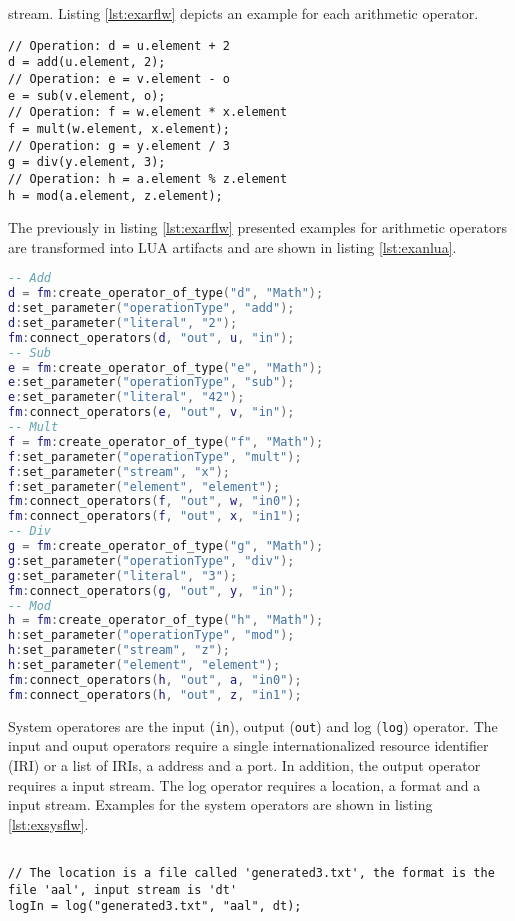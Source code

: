 stream. Listing \ref{lst:exarflw} depicts an example for each arithmetic 
operator.
\begin{lstlisting}[language=Flow, caption={\emph{Examples of Arithmetic Operators in Flow}},label={lst:exarflw}]
// Operation: d = u.element + 2
d = add(u.element, 2);
// Operation: e = v.element - o
e = sub(v.element, o);
// Operation: f = w.element * x.element
f = mult(w.element, x.element);
// Operation: g = y.element / 3
g = div(y.element, 3);
// Operation: h = a.element % z.element
h = mod(a.element, z.element); 
\end{lstlisting}
The previously in listing \ref{lst:exarflw} presented examples for 
arithmetic operators are transformed into LUA artifacts and are shown in listing
\ref{lst:exanlua}.
\begin{lstlisting}[language=LUA, caption={\emph{Examples of Arithmetic Operators in LUA}},label={lst:exanlua}]
-- Add
d = fm:create_operator_of_type("d", "Math");
d:set_parameter("operationType", "add");
d:set_parameter("literal", "2");
fm:connect_operators(d, "out", u, "in");
-- Sub
e = fm:create_operator_of_type("e", "Math");
e:set_parameter("operationType", "sub");
e:set_parameter("literal", "42");
fm:connect_operators(e, "out", v, "in");
-- Mult
f = fm:create_operator_of_type("f", "Math");
f:set_parameter("operationType", "mult");
f:set_parameter("stream", "x");
f:set_parameter("element", "element");
fm:connect_operators(f, "out", w, "in0");
fm:connect_operators(f, "out", x, "in1");
-- Div
g = fm:create_operator_of_type("g", "Math");
g:set_parameter("operationType", "div");
g:set_parameter("literal", "3");
fm:connect_operators(g, "out", y, "in");
-- Mod
h = fm:create_operator_of_type("h", "Math");
h:set_parameter("operationType", "mod");
h:set_parameter("stream", "z");
h:set_parameter("element", "element");
fm:connect_operators(h, "out", a, "in0");
fm:connect_operators(h, "out", z, "in1");
\end{lstlisting}
System operatores are the input (\texttt{in}), output (\texttt{out}) and log
(\texttt{log}) operator. The input and ouput operators require a single 
internationalized resource identifier (IRI) or a list of IRIs, a address and a 
port. In addition, the output operator requires a input stream. The log operator
requires a location, a format and a input stream. Examples for the system 
operators are shown in listing \ref{lst:exsysflw}.
\begin{lstlisting}[language=Flow, caption={\emph{Examples of system operators}},label={lst:exsysflw}]

// The location is a file called 'generated3.txt', the format is the file 'aal', input stream is 'dt'
logIn = log("generated3.txt", "aal", dt);
\end{lstlisting}


